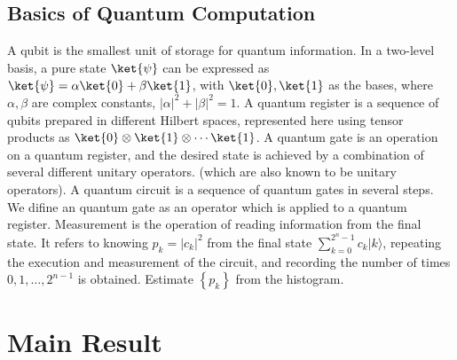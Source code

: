\documentclass[b5paper,papersize,dvipdfmx,fleqn]{article}
\begin{document}
\subsection{Basics of Quantum Computation}
A qubit is the smallest unit of storage for quantum information. In a two-level basis, a pure state $\ket{\psi }$ can be expressed as $\ket{\psi }=\alpha \ket{0}+\beta \ket{1}$, with $\ket{0}, \ket{1}$ as the bases, where $\alpha, \beta$ are complex constants, $|\alpha|^2 + |\beta|^2 = 1$. A quantum register is a sequence of qubits prepared in different Hilbert spaces, represented here using tensor products as $\ket{0}\otimes \ket{1}\otimes \cdots \ket{1}$. A quantum gate is an operation on a quantum register, and the desired state is achieved by a combination of several different unitary operators. (which are also known to be unitary operators). A quantum circuit is a sequence of quantum gates in several steps. We difine an quantum gate as an operator which is applied to a quantum register.
Measurement is the operation of reading information from the final state. It refers to knowing $p_{k}=\left|c_{k}\right|^{2}$ from the final state $\sum_{k=0}^{2^{n}-1} c_{k}|k\rangle$, repeating the execution and measurement of the circuit, and recording the number of times $0, 1, \ldots, 2^{n - 1}$ is obtained. Estimate $\left\{p_{k}\right\}$ from the histogram.





\section{Main Result}
\end{document}

